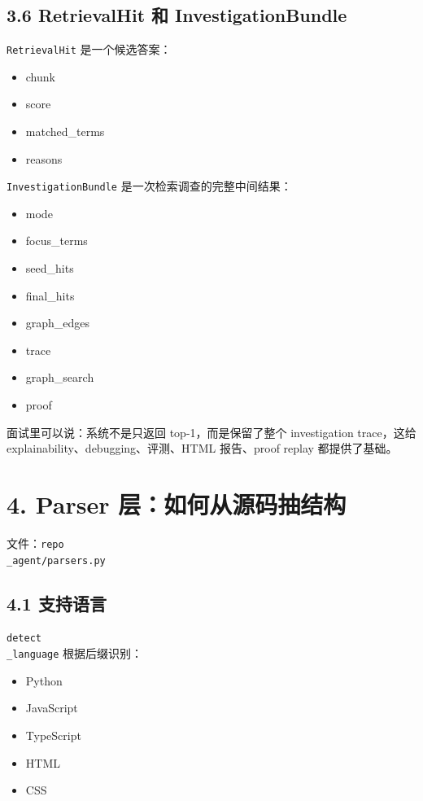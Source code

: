 \documentclass[UTF8,12pt,openany]{ctexbook}
\begin{document}
\subsection{3.6 RetrievalHit 和 InvestigationBundle}

\texttt{RetrievalHit} 是一个候选答案：\par

\begin{itemize}
\item chunk
\item score
\item matched\_terms
\item reasons
\end{itemize}

\texttt{InvestigationBundle} 是一次检索调查的完整中间结果：\par

\begin{itemize}
\item mode
\item focus\_terms
\item seed\_hits
\item final\_hits
\item graph\_edges
\item trace
\item graph\_search
\item proof
\end{itemize}

面试里可以说：系统不是只返回 top-1，而是保留了整个 investigation trace，这给 explainability、debugging、评测、HTML 报告、proof replay 都提供了基础。\par

\section{4. Parser 层：如何从源码抽结构}

文件：\texttt{repo\\_agent/parsers.py}\par

\subsection{4.1 支持语言}

\texttt{detect\\_language} 根据后缀识别：\par

\begin{itemize}
\item Python
\item JavaScript
\item TypeScript
\item HTML
\item CSS
\end{itemize}
\end{document}
